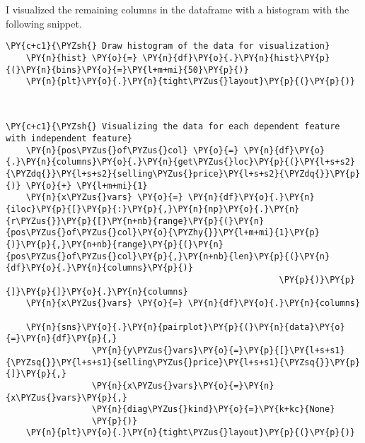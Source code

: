     \newpage

I visualized the remaining columns in the dataframe with a histogram with the following snippet. 


\begin{tcolorbox}[breakable, size=fbox, boxrule=1pt, pad at break*=1mm,colback=cellbackground, colframe=cellborder]
    \begin{Verbatim}[commandchars=\\\{\}]
    \PY{c+c1}{\PYZsh{} Draw histogram of the data for visualization}
    \PY{n}{hist} \PY{o}{=} \PY{n}{df}\PY{o}{.}\PY{n}{hist}\PY{p}{(}\PY{n}{bins}\PY{o}{=}\PY{l+m+mi}{50}\PY{p}{)}
    \PY{n}{plt}\PY{o}{.}\PY{n}{tight\PYZus{}layout}\PY{p}{(}\PY{p}{)}
    \end{Verbatim}
    \end{tcolorbox}
    
        \begin{center}
        \end{center}
        { \hspace*{\fill} \\}
        

\begin{tcolorbox}[breakable, size=fbox, boxrule=1pt, pad at break*=1mm,colback=cellbackground, colframe=cellborder]
    \begin{Verbatim}[commandchars=\\\{\}]
    \PY{c+c1}{\PYZsh{} Visualizing the data for each dependent feature with independent feature}
    \PY{n}{pos\PYZus{}of\PYZus{}col} \PY{o}{=} \PY{n}{df}\PY{o}{.}\PY{n}{columns}\PY{o}{.}\PY{n}{get\PYZus{}loc}\PY{p}{(}\PY{l+s+s2}{\PYZdq{}}\PY{l+s+s2}{selling\PYZus{}price}\PY{l+s+s2}{\PYZdq{}}\PY{p}{)} \PY{o}{+} \PY{l+m+mi}{1}
    \PY{n}{x\PYZus{}vars} \PY{o}{=} \PY{n}{df}\PY{o}{.}\PY{n}{iloc}\PY{p}{[}\PY{p}{:}\PY{p}{,}\PY{n}{np}\PY{o}{.}\PY{n}{r\PYZus{}}\PY{p}{[}\PY{n+nb}{range}\PY{p}{(}\PY{n}{pos\PYZus{}of\PYZus{}col}\PY{o}{\PYZhy{}}\PY{l+m+mi}{1}\PY{p}{)}\PY{p}{,}\PY{n+nb}{range}\PY{p}{(}\PY{n}{pos\PYZus{}of\PYZus{}col}\PY{p}{,}\PY{n+nb}{len}\PY{p}{(}\PY{n}{df}\PY{o}{.}\PY{n}{columns}\PY{p}{)}
                                                      \PY{p}{)}\PY{p}{]}\PY{p}{]}\PY{o}{.}\PY{n}{columns}
    \PY{n}{x\PYZus{}vars} \PY{o}{=} \PY{n}{df}\PY{o}{.}\PY{n}{columns}
    
    \PY{n}{sns}\PY{o}{.}\PY{n}{pairplot}\PY{p}{(}\PY{n}{data}\PY{o}{=}\PY{n}{df}\PY{p}{,}
                 \PY{n}{y\PYZus{}vars}\PY{o}{=}\PY{p}{[}\PY{l+s+s1}{\PYZsq{}}\PY{l+s+s1}{selling\PYZus{}price}\PY{l+s+s1}{\PYZsq{}}\PY{p}{]}\PY{p}{,}
                 \PY{n}{x\PYZus{}vars}\PY{o}{=}\PY{n}{x\PYZus{}vars}\PY{p}{,}
                 \PY{n}{diag\PYZus{}kind}\PY{o}{=}\PY{k+kc}{None}
                 \PY{p}{)}
    \PY{n}{plt}\PY{o}{.}\PY{n}{tight\PYZus{}layout}\PY{p}{(}\PY{p}{)}
    \end{Verbatim}
    \end{tcolorbox}
    
